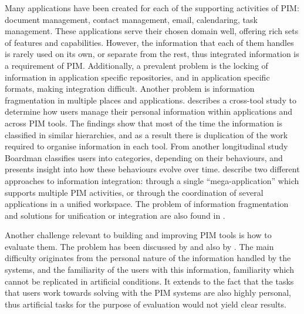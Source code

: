 Many applications have been created for each of the supporting activities of PIM: document management, contact management, email, calendaring, task management. These applications serve their chosen domain well, offering rich sets of features and capabilities. However, the information that each of them handles is rarely used on its own, or separate from the rest, thus integrated information is a requirement of PIM. Additionally, a prevalent problem is the locking of information in application specific repositories, and in application specific formats, making integration difficult. Another problem is information fragmentation in multiple places and applications. \cite{Boardman2004} describes a cross-tool study to determine how users manage their personal information within applications and across PIM tools. The findings show that most of the time the information is classified in similar hierarchies, and as a result there is duplication of the work required to organise information in each tool. From another 
longitudinal study Boardman classifies users into categories, depending on their behaviours, and presents insight into how these behaviours evolve over time. \cite{Kaptelinin2007} describe two different approaches to information integration: through a single ``mega-application'' which supports multiple PIM activities, or through the coordination of several applications in a unified workspace. The problem of information fragmentation and solutions for unification or integration are also found in \cite{Karger2006,Karger2007}.

Another challenge relevant to building and improving PIM tools is how to evaluate them. The problem has been discussed by \cite{Whittaker2000} and also by \cite{Kelly2006,Elsweiler2007,Bernstein2007}. The main difficulty o\-riginates from the personal nature of the information handled by the systems, and the familiarity of the users with this information, familiarity which cannot be replicated in artificial conditions. It extends to the fact that the tasks that users work towards solving with the PIM systems are also highly personal, thus artificial tasks for the purpose of evaluation would not yield clear results. 
